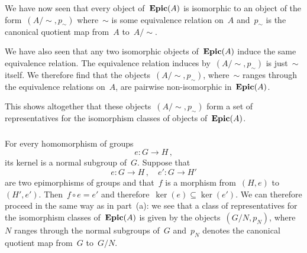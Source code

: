 We have now seen that every object of~$\mathbf{Epic}(A)$ is isomorphic to an object of the form~$(A / {∼}, p_{∼})$ where~$∼$ is some equivalence relation on~$A$ and~$p_{∼}$ is the canonical quotient map from~$A$ to~$A / {∼}$.

We have also seen that any two isomorphic objects of~$\mathbf{Epic}(A)$ induce the same equivalence relation.
The equivalence relation induces by~$(A / {∼}, p_{∼})$ is just~$∼$ itself.
We therefore find that the objects~$(A / {∼}, p_{∼})$, where~$∼$ ranges through the equivalence relations on~$A$, are pairwise non-isomorphic in~$\mathbf{Epic}(A)$.

This shows altogether that these objects~$(A / {∼}, p_{∼})$ form a set of representatives for the isomorphism classes of objects of~$\mathbf{Epic}(A)$.



\subsubsection{}

For every homomorphism of groups
\[
	e \colon G \to H \,,
\]
its kernel is a normal subgroup of~$G$.
Suppose that
\[
	e \colon G \to H \,,
	\quad
	e' \colon G \to H'
\]
are two epimorphisms of groups and that~$f$ is a morphism from~$(H, e)$ to~$(H', e')$.
Then~$f ∘ e = e'$ and therefore~$\ker(e) ⊆ \ker(e')$.
We can therefore proceed in the same way as in part~(a):
we see that a class of representatives for the isomorphism classes of~$\mathbf{Epic}(A)$ is given by the objects~$(G / N, p_N)$, where~$N$ ranges through the normal subgroups of~$G$ and~$p_N$ denotes the canonical quotient map from~$G$ to~$G / N$.
